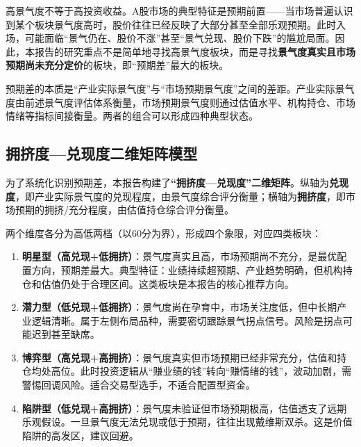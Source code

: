 高景气度不等于高投资收益。A股市场的典型特征是预期前置——当市场普遍认识到某个板块景气度高时，股价往往已经反映了大部分甚至全部乐观预期。此时入场，可能面临“景气仍在、股价不涨”甚至“景气兑现、股价下跌”的尴尬局面。因此，本报告的研究重点不是简单地寻找高景气度板块，而是寻找\textbf{景气度真实且市场预期尚未充分定价}的板块，即“预期差”最大的板块。

预期差的本质是“产业实际景气度”与“市场预期景气度”之间的差距。产业实际景气度由前述景气度评估体系衡量，市场预期景气度则通过估值水平、机构持仓、市场情绪等指标间接衡量。两者的组合可以形成四种典型状态。

\subsection{拥挤度—兑现度二维矩阵模型}

为了系统化识别预期差，本报告构建了\textbf{“拥挤度—兑现度”二维矩阵}。纵轴为\textbf{兑现度}，即产业实际景气度的兑现程度，由景气度综合评分衡量；横轴为\textbf{拥挤度}，即市场预期的拥挤/充分程度，由估值持仓综合评分衡量。

两个维度各分为高低两档（以60分为界），形成四个象限，对应四类板块：

\begin{enumerate}[leftmargin=2em]
\item \textbf{明星型（高兑现+低拥挤）}：景气度真实且高，市场预期尚不充分，是最优配置方向，预期差最大。典型特征：业绩持续超预期、产业趋势明确，但机构持仓和估值仍处于合理区间。这类板块是本报告的核心推荐方向。
\item \textbf{潜力型（低兑现+低拥挤）}：景气度尚在孕育中，市场关注度低，但中长期产业逻辑清晰。属于左侧布局品种，需要密切跟踪景气拐点信号。风险是拐点可能迟到甚至缺席。
\item \textbf{博弈型（高兑现+高拥挤）}：景气度真实但市场预期已经非常充分，估值和持仓均处高位。此时投资逻辑从“赚业绩的钱”转向“赚情绪的钱”，波动加剧，需警惕回调风险。适合交易型选手，不适合配置型资金。
\item \textbf{陷阱型（低兑现+高拥挤）}：景气度未验证但市场预期极高，估值透支了远期乐观假设。一旦景气度无法兑现或低于预期，往往出现戴维斯双杀。这是价值陷阱的高发区，建议回避。
\end{enumerate}

